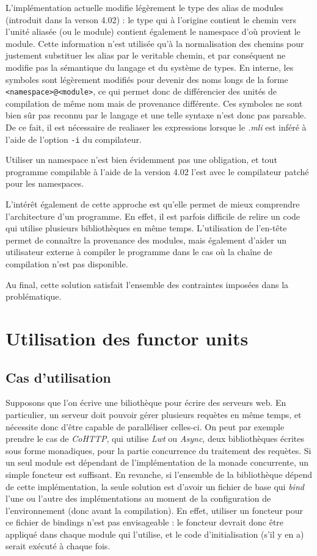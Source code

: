 \documentclass[11pt,a4paper]{report}
\begin{document}
L'implémentation actuelle modifie légèrement le type des alias de modules
(introduit dans la verson 4.02) : le type qui à l'origine contient le chemin
vers l'unité aliasée (ou le module) contient également le namespace d'où
provient le module. Cette information n'est utilisée qu'à la normalisation des
chemins pour justement substituer les alias par le veritable chemin, et par
conséquent ne modifie pas la sémantique du langage et du système de types.
En interne, les symboles sont légèrement modifiés pour devenir des noms longs de
la forme \texttt{<namespace>@<module>}, ce qui permet donc de différencier des
unités de compilation de même nom mais de provenance différente. Ces symboles ne
sont bien sûr pas reconnu par le langage et une telle syntaxe n'est donc pas
parsable. De ce fait, il est nécessaire de realiaser les expressions lorsque le
\emph{.mli} est inféré à l'aide de l'option \texttt{-i} du compilateur.

Utiliser un namespace n'est bien évidemment pas une obligation, et tout
programme compilable à l'aide de la version 4.02 l'est avec le compilateur
patché pour les namespaces.

L'intérêt également de cette approche est qu'elle permet de mieux comprendre
l'architecture d'un programme. En effet, il est parfois difficile de relire un
code qui utilise plusieurs bibliothèques en même temps. L'utilisation de
l'en-tête permet de connaître la provenance des modules, mais également d'aider
un utilisateur externe à compiler le programme dans le cas où la chaîne de
compilation n'est pas disponible.

Au final, cette solution satisfait l'ensemble des contraintes imposées dans la
problématique.

\section{Utilisation des functor units}

\subsection{Cas d'utilisation}

Supposons que l'on écrive une biliothèque pour écrire des serveurs web. En
particulier, un serveur doit pouvoir gérer plusieurs requètes en même temps, et
nécessite donc d'être capable de paralléliser celles-ci. On peut par exemple
prendre le cas de \emph{CoHTTP}, qui utilise \emph{Lwt} ou \emph{Async}, deux
bibliothèques écrites sous forme monadiques, pour la partie concurrence du
traitement des requètes. Si un seul module est dépendant de l'implémentation de
la monade concurrente, un simple foncteur est suffisant. En revanche, si
l'ensemble de la bibliothèque dépend de cette implémentation, la seule solution
est d'avoir un fichier de base qui \emph{bind} l'une ou l'autre des
implémentations au moment de la configuration de l'environnement (donc avant la
compilation). En effet, utiliser un foncteur pour ce fichier de bindings n'est
pas envisageable : le foncteur devrait donc être appliqué dans chaque module qui
l'utilise, et le code d'initialisation (s'il y en a) serait exécuté à chaque
fois.
\end{document}
